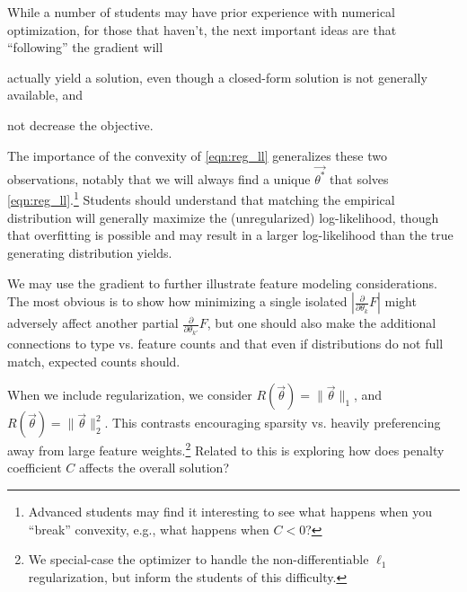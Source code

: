 \documentclass[11pt,letterpaper]{article}
\begin{document}
While a number of students may have prior experience with numerical optimization, for those that haven't, the next 
important ideas are that ``following'' the gradient will
\begin{inparaenum}[i)]
\item actually yield a solution, even though a closed-form solution is not generally available, and
\item not decrease the objective.
\end{inparaenum}
The importance of the convexity of \eqref{eqn:reg_ll} generalizes these two observations, 
notably that we will always find a unique $\vec{\theta^*}$ that solves 
\eqref{eqn:reg_ll}.\footnote{Advanced students may find it interesting to see what happens 
when you ``break'' convexity, e.g., what happens when $C < 0$?}
Students should understand that matching the empirical distribution will generally maximize the (unregularized) log-likelihood, 
though that overfitting is possible and may result in a larger log-likelihood than the true generating distribution yields.

We may use the gradient to further illustrate feature modeling considerations. The most obvious is to show how 
minimizing a single isolated $|\frac{\partial}{\partial \theta_k} F|$ might adversely affect another partial 
$\frac{\partial}{\partial \theta_{k'}}F$, but one should also make the additional connections to type vs. feature counts 
and that even if distributions do not full match, expected counts should.

When we include regularization, we consider $R(\vec{\theta}) = \|\vec\theta\|_1$, and 
$R(\vec{\theta}) = \|\vec{\theta}\|_2^2$. This contrasts encouraging sparsity vs.  
heavily preferencing away from large feature weights.\footnote{We special-case the optimizer 
to handle the non-differentiable $\ell_1$ regularization, but inform the students of this difficulty.} 
Related to this is exploring how does  penalty coefficient $C$ affects the overall solution?
\end{document}
